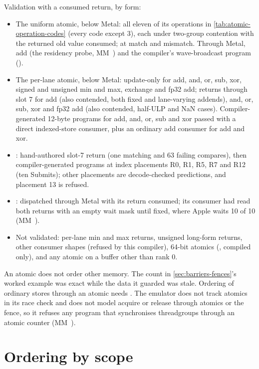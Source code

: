 Validation with a consumed return, by form:

\begin{itemize}
\item The uniform atomic, below Metal: all eleven of its operations in \cref{tab:atomic-operation-codes} (every code except 3), each under two-group
  contention with the returned old value consumed;  at match and
  mismatch. Through Metal, add (the residency probe, MM~)
  and the compiler's wave-broadcast program ().
\item The per-lane atomic, below Metal: update-only for add, and, or, sub, xor, signed and unsigned min and max, exchange and
  fp32 add; returns through slot 7 for add (also contended, both fixed and lane-varying addends), and, or, sub, xor and
  fp32 add (also contended, half-ULP and NaN cases). Compiler-generated 12-byte programs for add, and, or, sub and xor
  passed with a direct indexed-store consumer, plus an ordinary add consumer for add and xor.
\item {}: hand-authored slot-7 return (one matching and 63 failing compares), then
  compiler-generated programs at index placements R0, R1, R5, R7 and R12 (ten Submits); other placements are decode-checked
  predictions, and placement 13 is refused.
\item {}: dispatched through Metal with its return consumed; its  consumer had read both returns with an empty wait mask until fixed, where Apple waits 10 of 10 (MM~).
\item Not validated: per-lane min and max returns, unsigned long-form returns, other consumer shapes (refused by this
  compiler), 64-bit atomics (, compiled only), and any atomic on a buffer other
  than rank 0.
\end{itemize}

An atomic does not order other memory. The count in \cref{sec:barriers-fences}'s worked example was exact while the data it
guarded was stale. Ordering of ordinary stores through an atomic needs . The emulator does not
track atomics in its race check and does not model acquire or release through atomics or the fence, so it refuses any
program that synchronises threadgroups through an atomic counter (MM~).

\section{Ordering by scope}\label{sec:ordering-across-lanes}

